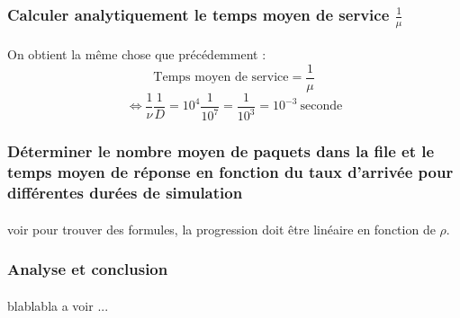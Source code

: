             \subsubsection{Calculer analytiquement le temps moyen de service $\frac{1}{\mu}$}
%
                \paragraph{}
On obtient la même chose que précédemment :
\[  \text{Temps moyen de service} = \frac{1}{\mu} \]
\[ \iff \frac{1}{\nu} \frac{1}{D} = 10^{4} \frac{1}{10^{7}} = \frac{1}{10^{3}} = 10^{-3} \ \text{seconde} \]
%
            \subsubsection{Déterminer le nombre moyen de paquets dans la file et le temps moyen de réponse en fonction du taux d'arrivée pour différentes durées de simulation}
%
                \paragraph{}
voir pour trouver des formules, la progression doit être linéaire en fonction de $\rho$.
%
            \subsubsection{Analyse et conclusion}
%
                \paragraph{}
blablabla a voir ...
%
    \clearpage
%
